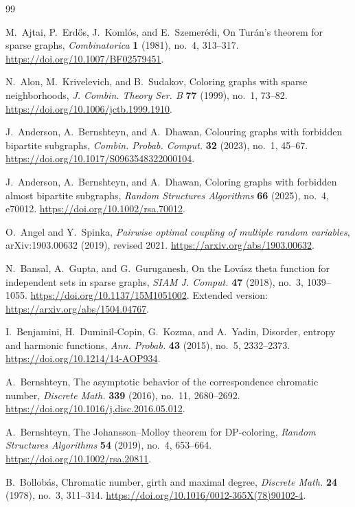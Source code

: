 \begin{thebibliography}{99}
\raggedright

M.~Ajtai, P.~Erd\H{o}s, J.~Koml\'os, and E.~Szemer\'edi,
On Tur\'an's theorem for sparse graphs,
\emph{Combinatorica} \textbf{1} (1981), no.~4, 313--317.
\url{https://doi.org/10.1007/BF02579451}.

N.~Alon, M.~Krivelevich, and B.~Sudakov,
Coloring graphs with sparse neighborhoods,
\emph{J. Combin. Theory Ser. B} \textbf{77} (1999), no.~1, 73--82.
\url{https://doi.org/10.1006/jctb.1999.1910}.

J.~Anderson, A.~Bernshteyn, and A.~Dhawan,
Colouring graphs with forbidden bipartite subgraphs,
\emph{Combin. Probab. Comput.} \textbf{32} (2023), no.~1, 45--67.
\url{https://doi.org/10.1017/S0963548322000104}.

J.~Anderson, A.~Bernshteyn, and A.~Dhawan,
Coloring graphs with forbidden almost bipartite subgraphs,
\emph{Random Structures Algorithms} \textbf{66} (2025), no.~4, e70012.
\url{https://doi.org/10.1002/rsa.70012}.

O.~Angel and Y.~Spinka,
\emph{Pairwise optimal coupling of multiple random variables},
arXiv:1903.00632 (2019), revised 2021.
\url{https://arxiv.org/abs/1903.00632}.

N.~Bansal, A.~Gupta, and G.~Guruganesh,
On the Lov\'asz theta function for independent sets in sparse graphs,
\emph{SIAM J. Comput.} \textbf{47} (2018), no.~3, 1039--1055.
\url{https://doi.org/10.1137/15M1051002}.
Extended version: \url{https://arxiv.org/abs/1504.04767}.

I.~Benjamini, H.~Duminil-Copin, G.~Kozma, and A.~Yadin,
Disorder, entropy and harmonic functions,
\emph{Ann. Probab.} \textbf{43} (2015), no.~5, 2332--2373.
\url{https://doi.org/10.1214/14-AOP934}.

A.~Bernshteyn,
The asymptotic behavior of the correspondence chromatic number,
\emph{Discrete Math.} \textbf{339} (2016), no.~11, 2680--2692.
\url{https://doi.org/10.1016/j.disc.2016.05.012}.

A.~Bernshteyn,
The Johansson--Molloy theorem for DP-coloring,
\emph{Random Structures Algorithms} \textbf{54} (2019), no.~4, 653--664.
\url{https://doi.org/10.1002/rsa.20811}.

B.~Bollob\'as,
Chromatic number, girth and maximal degree,
\emph{Discrete Math.} \textbf{24} (1978), no.~3, 311--314.
\url{https://doi.org/10.1016/0012-365X(78)90102-4}.


\end{thebibliography}
